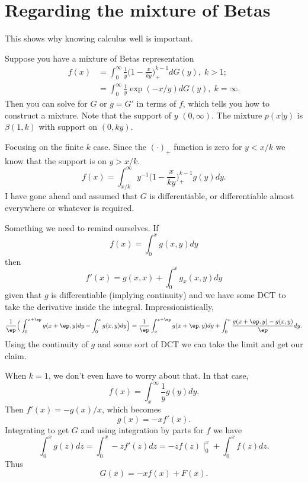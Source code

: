 \documentclass{article}
\begin{document}
\tableofcontents

\large %

\section{Regarding the mixture of Betas}

This shows why knowing calculus well is important.

Suppose you have a mixture of Betas representation
\begin{align*}
f(x) 
& = \int_0^\infty \frac{1}{y} \Big( 1 - \frac{x}{ky} \Big)^{k-1}_+ dG(y), \; k > 1; \\
& = \int_0^\infty \frac{1}{y} \exp(-x/y) dG(y), \; k = \infty.
\end{align*}
Then you can solve for $G$ or $g = G'$ in terms of $f$, which tells you how to
construct a mixture.  Note that the support of $y$ $(0, \infty)$.  The mixture
$p(x|y)$ is $\beta(1, k)$ with support on $(0, ky)$.

Focusing on the finite $k$ case.  Since the $(\cdot)_+$ function is zero for $y
< x/k$ we know that the support is on $y > x/k$.
\[
f(x) = \int_{x/k}^\infty y^{-1}  \Big( 1 - \frac{x}{ky} \Big)^{k-1}_+ g(y) dy.
\]
I have gone ahead and assumed that $G$ is differentiable, or differentiable
almost everywhere or whatever is required.

Something we need to remind ourselves.  If 
\[
f(x) = \int_0^x g(x,y) dy
\]
then
\[
f'(x) = g(x,x) + \int_0^x g_x(x,y) dy
\]
given that $g$ is differentiable (implying continuity) and we have some DCT to
take the derivative inside the integral.  Impressionistically,
\[
\frac{1}{\ep} \Big( \int_0^{x+\ep} g(x+\ep, y) dy - \int_0^{x} g(x, y) dy \Big)
= \frac{1}{\ep} \int_x^{x+\ep} g(x+\ep, y) dy
+ \int_0^x \frac{g(x+\ep, y) - g(x,y)}{\ep} dy.
\]
Using the continuity of $g$ and some sort of DCT we can take the limit and get
our claim.

When $k=1$, we don't even have to worry about that.  In that case,
\[
f(x) = \int_x^\infty \frac{1}{y} g(y) dy.
\]
Then \( f'(x) = - g(x) / x \), which becomes
\[
g(x) = -x f'(x).
\]
Integrating to get $G$ and using integration by parts for $f$ we have
\[
\int_0^x g(z) dz = \int_0^x -z f'(z) dz = -z f(z) \mid_{0}^x + \int_0^x f(z) dz.
\]
Thus
\[
G(x) = -x f(x) + F(x).
\]
\end{document}

